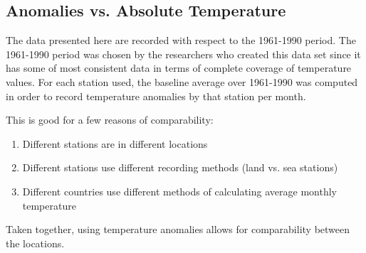 \documentclass{article}\usepackage{graphicx, color}
\begin{document}
\subsection*{Anomalies vs. Absolute Temperature}
The data presented here are recorded with respect to the 1961-1990 period.  The 1961-1990 period was chosen by the researchers who created this data set since it has some of most consistent data in terms of complete coverage of temperature values. For each station used, the baseline average over 1961-1990 was computed in order to record temperature anomalies by that station per month.

This is good for a few reasons of comparability:
\begin{enumerate}
\item Different stations are in different locations
\item Different stations use different recording methods (land vs. sea stations)
\item Different countries use different methods of calculating average monthly temperature
\end{enumerate}
Taken together, using temperature anomalies allows for comparability between the locations.
\end{document}
